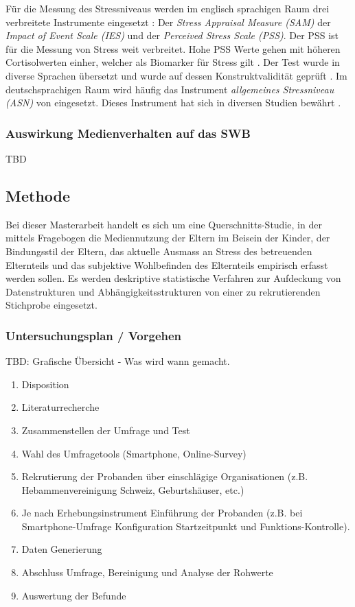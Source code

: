 Für die Messung des Stressniveaus werden im englisch sprachigen Raum drei verbreitete Instrumente eingesetzt \cite{Andreou2011}: Der \textit{Stress Appraisal Measure (SAM)} der \textit{Impact of Event Scale (IES)} und der \textit{Perceived Stress Scale (PSS)}. Der PSS ist für die Messung von Stress weit verbreitet. Hohe PSS Werte gehen mit höheren Cortisolwerten einher, welcher als Biomarker für Stress gilt \cite{Malarkey1995, VanEck2005}. Der Test wurde in diverse Sprachen übersetzt und wurde auf dessen Konstruktvalidität geprüft \cite{Cohen1988, Byrne2005}. Im deutschsprachigen Raum wird häufig das Instrument \textit{allgemeines Stressniveau (ASN)} von  eingesetzt. Dieses Instrument hat sich in diversen Studien bewährt \cite{Cina2009}.
 
\subsubsection{Auswirkung Medienverhalten auf das SWB}
TBD

\subsection{Methode}
Bei dieser Masterarbeit handelt es sich um eine Querschnitts-Studie, in der mittels Fragebogen die Mediennutzung der Eltern im Beisein der Kinder, der Bindungsstil der Eltern, das aktuelle Ausmass an Stress des betreuenden Elternteils und das subjektive Wohlbefinden des Elternteils empirisch erfasst werden sollen. 
Es werden deskriptive statistische Verfahren zur Aufdeckung von Datenstrukturen und Abhängigkeitsstrukturen von einer zu rekrutierenden Stichprobe eingesetzt.
\subsubsection{Untersuchungsplan / Vorgehen}
TBD: Grafische Übersicht - Was wird wann gemacht.
\begin{enumerate}
    \item Disposition
    \item Literaturrecherche
    \item Zusammenstellen der Umfrage und Test
    \item Wahl des Umfragetools (Smartphone, Online-Survey)
    \item Rekrutierung der Probanden über einschlägige Organisationen (z.B. Hebammenvereinigung Schweiz, Geburtshäuser, etc.)
    \item Je nach Erhebungsinstrument Einführung der Probanden (z.B. bei Smartphone-Umfrage Konfiguration Startzeitpunkt und Funktions-Kontrolle).
    \item Daten Generierung
    \item Abschluss Umfrage, Bereinigung und Analyse der Rohwerte
    \item Auswertung der Befunde
\end{enumerate}
